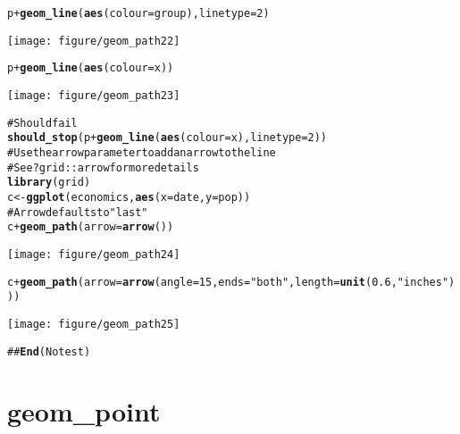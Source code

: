 \documentclass[a4paper,titlepage]{tufte-handout}\usepackage{graphicx, color}
\makeatletter
\def\maxwidth{ %
  \ifdim\Gin@nat@width>\linewidth
    \linewidth
  \else
    \Gin@nat@width
  \fi
}
\newcommand{\hlfunctioncall}[1]{\textcolor[rgb]{0.501960784313725,0,0.329411764705882}{\textbf{#1}}}%
\newcommand{\hlstring}[1]{\textcolor[rgb]{0.6,0.6,1}{#1}}%
\newcommand{\hlcomment}[1]{\textcolor[rgb]{0.180392156862745,0.6,0.341176470588235}{#1}}%
\newenvironment{kframe}{%
 \def\at@end@of@kframe{}%
 \ifinner\ifhmode%
  \def\at@end@of@kframe{\end{minipage}}%
  \begin{minipage}{\columnwidth}%
 \fi\fi%
 \def\FrameCommand##1{\hskip\@totalleftmargin \hskip-\fboxsep
 \colorbox{shadecolor}{##1}\hskip-\fboxsep
     \hskip-\linewidth \hskip-\@totalleftmargin \hskip\columnwidth}%
 \MakeFramed {\advance\hsize-\width
   \@totalleftmargin\z@ \linewidth\hsize
   \@setminipage}}%
 {\par\unskip\endMakeFramed%
 \at@end@of@kframe}
\newenvironment{knitrout}{}{} %
\makeatother
\begin{document}
\begin{knitrout}
\begin{kframe}
\begin{alltt}
p + \hlfunctioncall{geom_line}(\hlfunctioncall{aes}(colour = group), linetype = 2)
\end{alltt}
\end{kframe}\texttt{[image: figure/geom\_path22]} \begin{kframe}\begin{alltt}
p + \hlfunctioncall{geom_line}(\hlfunctioncall{aes}(colour = x))
\end{alltt}
\end{kframe}\texttt{[image: figure/geom\_path23]} \begin{kframe}\begin{alltt}
\hlcomment{# Should fail}
\hlfunctioncall{should_stop}(p + \hlfunctioncall{geom_line}(\hlfunctioncall{aes}(colour = x), linetype=2))
\hlcomment{# Use the arrow parameter to add an arrow to the line}
\hlcomment{# See ?grid::arrow for more details}
\hlfunctioncall{library}(grid)
c <- \hlfunctioncall{ggplot}(economics, \hlfunctioncall{aes}(x = date, y = pop))
# Arrow defaults to \hlstring{"last"}
c + \hlfunctioncall{geom_path}(arrow = \hlfunctioncall{arrow}())
\end{alltt}
\end{kframe}\texttt{[image: figure/geom\_path24]} \begin{kframe}\begin{alltt}
c + \hlfunctioncall{geom_path}(arrow = \hlfunctioncall{arrow}(angle = 15, ends = \hlstring{"both"}, length = \hlfunctioncall{unit}(0.6, \hlstring{"inches"})))
\end{alltt}
\end{kframe}\texttt{[image: figure/geom\_path25]} \begin{kframe}\begin{alltt}
\hlcomment{## \hlfunctioncall{End}(No test)}
\end{alltt}
\end{kframe}
\end{knitrout}


\section{geom\_point}
\end{document}
